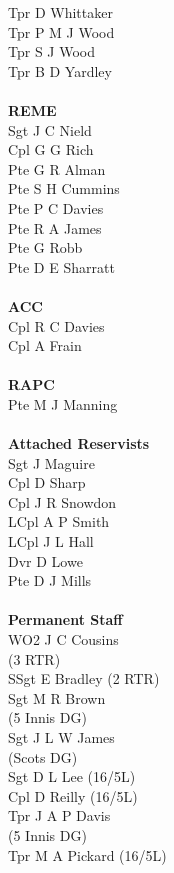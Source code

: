 \begin{multicols}{4}
  Tpr D Whittaker \\
  Tpr P M J Wood \\
  Tpr S J Wood \\
  Tpr B D Yardley \\
  \\
  \textbf{REME} \\
  Sgt J C Nield \\
  Cpl G G Rich \\
  Pte G R Alman \\
  Pte S H Cummins \\
  Pte P C Davies \\
  Pte R A James \\
  Pte G Robb \\
  Pte D E Sharratt \\
  \\
  \textbf{ACC} \\
  Cpl R C Davies \\
  Cpl A Frain \\
  \\
  \textbf{RAPC} \\
  Pte M J Manning \\
  \\
  \textbf{Attached Reservists} \\
  Sgt J Maguire \\
  Cpl D Sharp \\
  Cpl J R Snowdon \\
  LCpl A P Smith \\
  LCpl J L Hall \\
  Dvr D Lowe \\
  Pte D J Mills \\
  \\
  \textbf{Permanent Staff} \\
  WO2 J C Cousins \\ \indent (3 RTR) \\
  SSgt E Bradley (2 RTR) \\
  Sgt M R Brown \\ \indent (5 Innis DG) \\
  Sgt J L W James \\ \indent (Scots DG) \\
  Sgt D L Lee (16/5L) \\
  Cpl D Reilly (16/5L) \\
  Tpr J A P Davis \\ \indent (5 Innis DG) \\
  Tpr M A Pickard (16/5L)
\end{multicols}

\pagebreak
